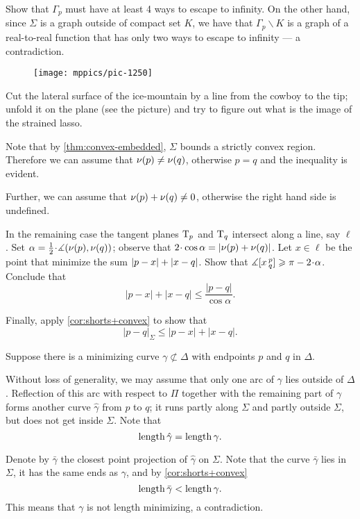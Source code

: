 Show that $\Gamma_p$ must have at least 4 ways to escape to infinity.
On the other hand, since $\Sigma$ is a graph outside of compact set $K$, we have that $\Gamma_p\backslash K$ is a graph of a real-to-real function that has only two ways to escape to infinity --- a contradiction.

\setcounter{eqtn}{0}

\begin{wrapfigure}[5]{r}{24 mm}
\vskip-0mm
\centering
\texttt{[image: mppics/pic-1250]}
\vskip-0mm
\end{wrapfigure}

Cut the lateral surface of the ice-mountain by a line from the cowboy to the tip;
unfold it on the plane (see the picture) and try to figure out what is the image of the strained lasso.

Note that by \ref{thm:convex-embedded}, $\Sigma$ bounds a strictly convex region.
Therefore we can assume that $\nu(p)\ne\nu(q)$, otherwise $p=q$ and the inequality is evident.

Further, we can assume that $\nu(p)+\nu(q)\ne 0$, otherwise the right hand side is undefined.


In the remaining case the tangent planes $\mathrm{T}_p$ and $\mathrm{T}_q$ intersect along a line, say $\ell$.
Set $\alpha=\tfrac12\cdot\measuredangle(\Norm(p),\Norm(q))$;
observe that $2\cdot\cos\alpha= |\Norm(p)+\Norm(q)|$.
Let $x\in \ell$ be the point that minimize the sum $|p-x|\z+|x-q|$.
Show that $\measuredangle\hinge xpq\ge \pi-2\cdot\alpha$.
Conclude that 
\[|p-x|+|x-q|\le \frac{|p-q|}{\cos\alpha}.\]

Finally, apply \ref{cor:shorts+convex} to show that
\[|p-q|_\Sigma\le |p-x|+|x-q|.\]


 Suppose there is a minimizing curve $\gamma\not\subset\Delta$ with endpoints $p$ and $q$ in $\Delta$.

Without loss of generality, we may assume that only one arc of $\gamma$ lies outside of $\Delta$.
Reflection of this arc  with respect to $\Pi$ together with the remaining part of $\gamma$ forms another curve $\hat\gamma$ from $p$ to $q$;
it runs partly along $\Sigma$ 
and partly outside $\Sigma$,
but does not get inside $\Sigma$.
Note that
\[\mathop{\rm length}\nolimits\hat\gamma=\mathop{\rm length}\nolimits\gamma.\]


Denote by $\bar\gamma$ the closest point projection of $\hat\gamma$ on $\Sigma$.
Note that the curve $\bar\gamma$ lies in $\Sigma$, 
it has the same ends as $\gamma$,
and by \ref{cor:shorts+convex}
\[\mathop{\rm length}\nolimits\bar\gamma<\mathop{\rm length}\nolimits\gamma.\]
This means that $\gamma$ is not length minimizing, 
a contradiction.

